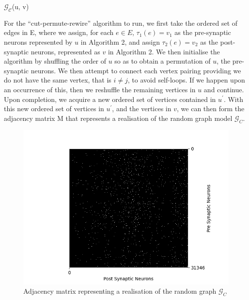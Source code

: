 \begin{algorithm}[H]
\DontPrintSemicolon
\SetAlgoLined
{}

{}
\caption{$\mathcal{G_{C}}$(u, v)}
\end{algorithm}

For the ``cut-permute-rewire'' \cite{WattsStrogatz1998} algorithm to run, we first take the ordered set of edges in E, where we assign, for each $e \in E$, $\tau_1(e) = v_1$ as the pre-synaptic neurons represented by $u$ in Algorithm 2, and assign $\tau_2(e) = v_2$ as the post-synaptic neurons, represented as $v$ in Algorithm 2. We then initialise the algorithm by shuffling the order of $u$ so as to obtain a permutation of $u$, the pre-synaptic neurons. We then attempt to connect each vertex pairing providing we do not have the same vertex, that is $i \neq j$, to avoid self-loops. If we happen upon an occurrence of this, then we reshuffle the remaining vertices in $u$ and continue. Upon completion, we acquire a new ordered set of vertices contained in $u^\prime$. With this new ordered set of vertices in $u^\prime$, and the vertices in $v$, we can then form the adjacency matrix M that represents a realisation of the random graph model $\mathcal{G}_{C}$. 

\begin{figure}[H]
\begin{center}
\captionsetup{justification=centering}
\includegraphics[width=12cm]{configuration/matrix_configuration.png}
\caption{Adjacency matrix representing a realisation of the random graph $\mathcal{G}_{C}$}
\end{center}
\end{figure}
